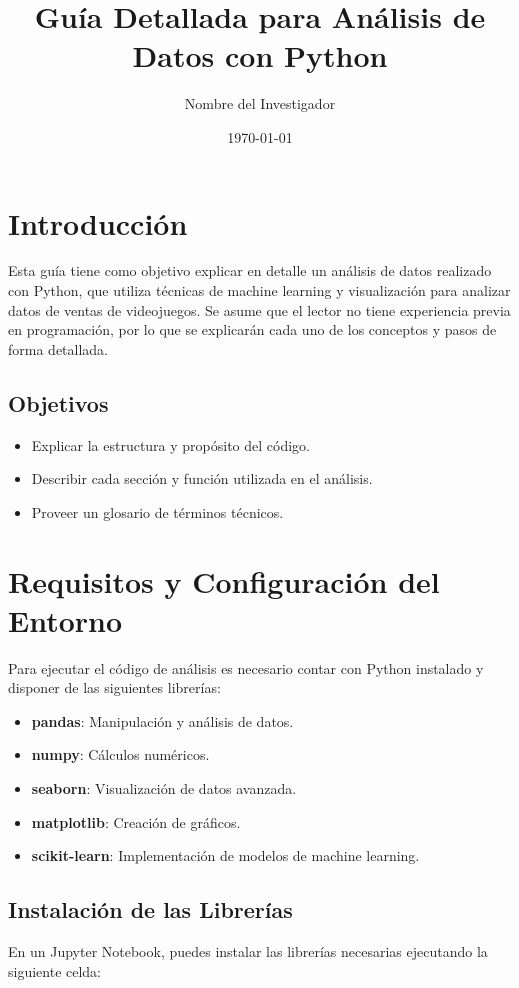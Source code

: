 \documentclass[12pt]{article}
\title{Guía Detallada para Análisis de Datos con Python}
\author{Nombre del Investigador}
\date{\today}
\begin{document}
\maketitle

\tableofcontents
\newpage

\section{Introducción}
Esta guía tiene como objetivo explicar en detalle un análisis de datos realizado con Python, que utiliza técnicas de machine learning y visualización para analizar datos de ventas de videojuegos. Se asume que el lector no tiene experiencia previa en programación, por lo que se explicarán cada uno de los conceptos y pasos de forma detallada.

\subsection{Objetivos}
\begin{itemize}
    \item Explicar la estructura y propósito del código.
    \item Describir cada sección y función utilizada en el análisis.
    \item Proveer un glosario de términos técnicos.
\end{itemize}

\section{Requisitos y Configuración del Entorno}
Para ejecutar el código de análisis es necesario contar con Python instalado y disponer de las siguientes librerías:
\begin{itemize}
    \item \textbf{pandas}: Manipulación y análisis de datos.
    \item \textbf{numpy}: Cálculos numéricos.
    \item \textbf{seaborn}: Visualización de datos avanzada.
    \item \textbf{matplotlib}: Creación de gráficos.
    \item \textbf{scikit-learn}: Implementación de modelos de machine learning.
\end{itemize}

\subsection{Instalación de las Librerías}
En un Jupyter Notebook, puedes instalar las librerías necesarias ejecutando la siguiente celda:
\end{document}
